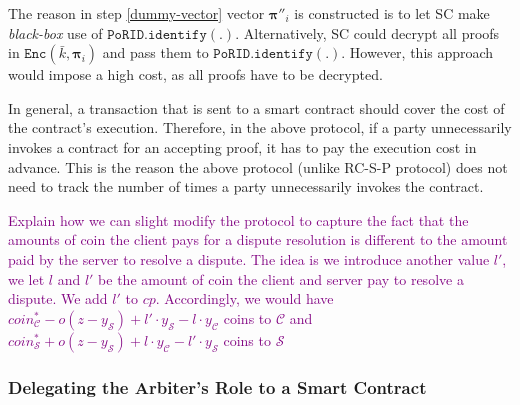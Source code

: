 \begin{enumerate}
\begin{enumerate}
\end{enumerate}
\end{enumerate}


\begin{remark}
The reason in step \ref{dummy-vector} vector $ {\bm{\pi}}''_{\scriptscriptstyle i}$ is constructed  is to let SC make \emph{black-box}  use of $\mathtt{PoRID.identify}(.)$. Alternatively, SC could decrypt all proofs in $\mathtt{Enc}(\bar{k}, {\bm{\pi}}_{\scriptscriptstyle i})$ and pass them to $\mathtt{PoRID.identify}(.)$. However, this approach would impose a high cost, as all proofs have to be decrypted. 
\end{remark}

\begin{remark}
In general, a transaction that is sent   to a smart contract should  cover the cost of the contract's execution. Therefore, in the above protocol, if a party unnecessarily invokes a contract for an accepting proof, it has to pay the execution cost in advance. This is the reason the above protocol (unlike RC-S-P protocol) does not need to track the number of times a party unnecessarily invokes the contract.    
\end{remark}


\begin{remark}
\textcolor{purple}{Explain how we can slight modify the protocol to capture the fact  that the amounts of coin the client pays for a dispute resolution is different to the amount paid by the server to resolve a dispute. The idea is we introduce another value $l'$, we let $l$ and $l'$ be the amount of coin the client and server pay to resolve a dispute.  We add $l'$ to $cp$. Accordingly, we would have $coin^{\scriptscriptstyle *}_{\scriptscriptstyle\mathcal C}-o(z-y_{\scriptscriptstyle\mathcal S})+l'\cdot y_{\scriptscriptstyle\mathcal S}-l\cdot y_{\scriptscriptstyle\mathcal C}$ coins  to $\mathcal C$ and  $coin^{\scriptscriptstyle *}_{\scriptscriptstyle\mathcal S}+o(z-y_{\scriptscriptstyle\mathcal S})+l\cdot y_{\scriptscriptstyle\mathcal C}-l'\cdot y_{\scriptscriptstyle\mathcal S}$ coins to $\mathcal S$}
\end{remark}


\subsubsection{Delegating the Arbiter's Role to  a Smart Contract}

